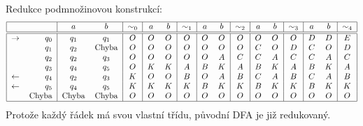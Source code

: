 Redukce podmnožinovou konstrukcí: 
\[
\begin{tabular}{|r r|c c|c|c c|c|c c|c|c c|c|c c|c|}
    \hline
    & & $a$ & $b$ & $\sim_0$ & $a$ & $b$ & $\sim_1$ & $a$ & $b$ & $\sim_2$ & $a$ & $b$ & $\sim_3$ & $a$ & $b$ & $\sim_4$\\
    \hline
    \hline
    $\rightarrow$ & $q_0$ &$q_1$ &$q_1$ &$O$ &$O$ &$O$ &$O$ &$O$ &$O$ &$O$ &$O$ &$O$ &$O$ &$D$ &$D$ &$E$\\
                  & $q_1$ &$q_2$ &Chyba &$O$ &$O$ &$O$ &$O$ &$O$ &$O$ &$O$ &$C$ &$O$ &$D$ &$C$ &$O$ &$D$\\
                  & $q_2$ &$q_2$ &$q_3$ &$O$ &$O$ &$O$ &$O$ &$O$ &$A$ &$C$ &$C$ &$A$ &$C$ &$C$ &$A$ &$C$\\
                  & $q_3$ &$q_4$ &$q_5$ &$O$ &$K$ &$K$ &$A$ &$B$ &$K$ &$A$ &$B$ &$K$ &$A$ &$B$ &$K$ &$A$\\
    $\leftarrow$  & $q_4$ &$q_2$ &$q_3$ &$K$ &$O$ &$O$ &$B$ &$O$ &$A$ &$B$ &$C$ &$A$ &$B$ &$C$ &$A$ &$B$\\
    $\leftarrow$  & $q_5$ &$q_4$ &$q_5$ &$K$ &$K$ &$K$ &$K$ &$B$ &$K$ &$K$ &$B$ &$K$ &$K$ &$B$ &$K$ &$K$\\
                  & Chyba &Chyba &Chyba &$O$ &$O$ &$O$ &$O$ &$O$ &$O$ &$O$ &$O$ &$O$ &$O$ &$O$ &$O$ &$O$\\
    \hline
\end{tabular}
\]
Protože každý řádek má svou vlastní třídu, původní DFA je již redukovaný.
